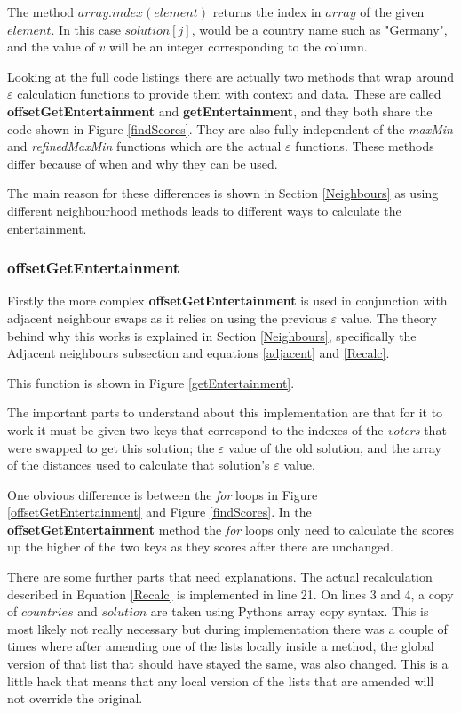 \documentclass[12pt]{report}
\begin{document}
The method $array.index(element)$ returns the index in $array$ of the given $element$. In this case $solution[j]$, would be a country name such as "Germany", and the value of $v$ will be an integer corresponding to the column.

Looking at the full code listings there are actually two methods that wrap around $\varepsilon$ calculation functions to provide them with context and data. These are called \textbf{offsetGetEntertainment} and \textbf{getEntertainment}, and they both share the code shown in Figure \ref{findScores}. They are also fully independent of the \textit{maxMin} and \textit{refinedMaxMin} functions which are the actual $\varepsilon$ functions. These methods differ because of when and why they can be used.

The main reason for these differences is shown in Section \ref{Neighbours} as using different neighbourhood methods leads to different ways to calculate the entertainment. 

\subsubsection{offsetGetEntertainment}
Firstly the more complex \textbf{offsetGetEntertainment} is used in conjunction with adjacent neighbour swaps as it relies on using the previous $\varepsilon$ value. The theory behind why this works is explained in Section \ref{Neighbours}, specifically the Adjacent neighbours subsection and equations \ref{adjacent} and \ref{Recalc}.

This function is shown in Figure \ref{getEntertainment}.

The important parts to understand about this implementation are that for it to work it must be given two keys that correspond to the indexes of the \textit{voters} that were swapped to get this solution; the $\varepsilon$ value of the old solution, and the array of the distances used to calculate that solution's $\varepsilon$ value.

One obvious difference is between the \textit{for} loops in Figure \ref{offsetGetEntertainment} and Figure \ref{findScores}. In the \textbf{offsetGetEntertainment} method the \textit{for} loops only need to calculate the scores up the higher of the two keys as they scores after there are unchanged.

There are some further parts that need explanations. The actual recalculation described in Equation \ref{Recalc} is implemented in line 21. On lines 3 and 4, a copy of $countries$ and $solution$ are taken using Pythons array copy syntax. This is most likely not really necessary but during implementation there was a couple of times where after amending one of the lists locally inside a method, the global version of that list that should have stayed the same, was also changed. This is a little hack that means that any local version of the lists that are amended will not override the original. 
\end{document}
